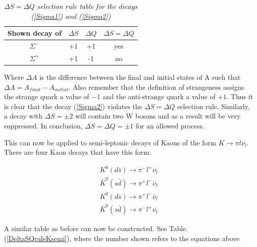 \begin{table}[h!]
\caption{\textit{$\Delta S = \Delta Q$ selection rule table for the decays (\ref{Sigma1}) and (\ref{Sigma2})}}
\centering
\setlength{\tabcolsep}{10pt}
\begin{tabular}{c| ccc}
\hline
Shown decay of   & $\Delta S$ & $\Delta Q$ & $\Delta S = \Delta Q$ \\ 
\hline \hline
$\Sigma^{-}$     &      +1    &    +1      & yes                   \\
$\Sigma^{+}$     &      +1    &    -1      & no                   \\
\hline
\end{tabular} 
\label{DeltaSQruleTable}
\end{table}

\smallskip

\noindent Where $\Delta A$ is the difference between the final and initial states of A such that $\Delta A = A_{final} - A_{initial}$. Also remember that the definition of strangeness assigns the strange quark a value of $-1$ and the anti-strange quark a value of $+1$. Thus it is clear that the decay (\ref{Sigma2}) violates the $\Delta S = \Delta Q$ selection rule. Similarly, a decay with $\Delta S = \pm 2$ will contain two W bosons and as a result will be very suppressed. In conclusion, $\Delta S = \Delta Q = \pm 1$ for an allowed process.      

This can now be applied to semi-leptonic decays of Kaons of the form $K \rightarrow \pi l \nu_{l}$. There are four Kaon decays that have this form:

\begin{align} %
\label{Ksemi1}
K^{0} (d \bar{s}) \rightarrow \pi^{-} l^{+} \nu_{l} \\
\label{Ksemi2}
\bar{K}^{0} (s \bar{d}) \rightarrow \pi^{+} l^{-} \bar{\nu}_{l} \\
\label{Ksemi3}
K^{0} (d \bar{s}) \rightarrow \pi^{+} l^{-} \bar{\nu}_{l} \\
\label{Ksemi4}
\bar{K}^{0} (s \bar{d}) \rightarrow \pi^{-} l^{+} \nu_{l} 
\end{align} 

\smallskip

\noindent A similar table as before can now be constructed. See Table.(\ref{DeltaSQruleKsemi}), where the number shown refers to the equations above

